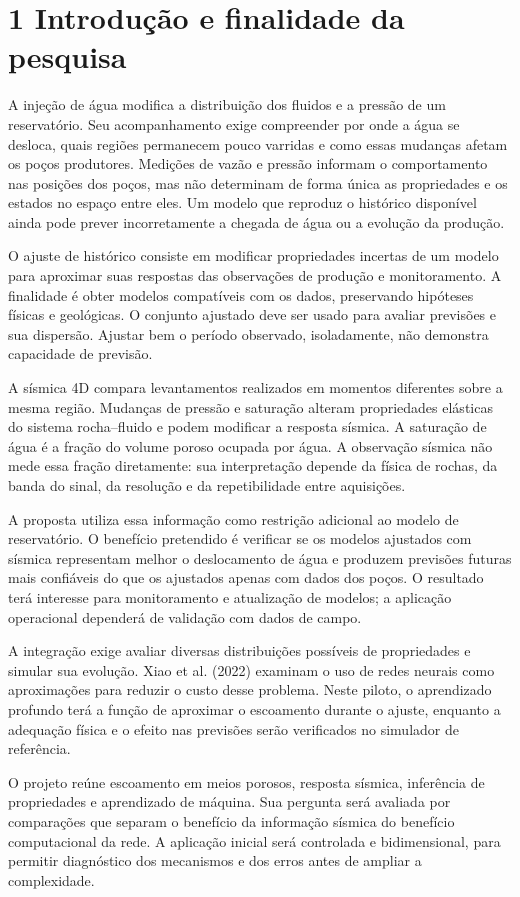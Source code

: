 \documentclass[12pt,a4paper]{article}
\begin{document}
\newpage
\section*{1 Introdução e finalidade da pesquisa}
A injeção de água modifica a distribuição dos fluidos e a pressão de um reservatório. Seu acompanhamento exige compreender por onde a água se desloca, quais regiões permanecem pouco varridas e como essas mudanças afetam os poços produtores. Medições de vazão e pressão informam o comportamento nas posições dos poços, mas não determinam de forma única as propriedades e os estados no espaço entre eles. Um modelo que reproduz o histórico disponível ainda pode prever incorretamente a chegada de água ou a evolução da produção.\par
O ajuste de histórico consiste em modificar propriedades incertas de um modelo para aproximar suas respostas das observações de produção e monitoramento. A finalidade é obter modelos compatíveis com os dados, preservando hipóteses físicas e geológicas. O conjunto ajustado deve ser usado para avaliar previsões e sua dispersão. Ajustar bem o período observado, isoladamente, não demonstra capacidade de previsão.\par
A sísmica 4D compara levantamentos realizados em momentos diferentes sobre a mesma região. Mudanças de pressão e saturação alteram propriedades elásticas do sistema rocha--fluido e podem modificar a resposta sísmica. A saturação de água é a fração do volume poroso ocupada por água. A observação sísmica não mede essa fração diretamente: sua interpretação depende da física de rochas, da banda do sinal, da resolução e da repetibilidade entre aquisições.\par
A proposta utiliza essa informação como restrição adicional ao modelo de reservatório. O benefício pretendido é verificar se os modelos ajustados com sísmica representam melhor o deslocamento de água e produzem previsões futuras mais confiáveis do que os ajustados apenas com dados dos poços. O resultado terá interesse para monitoramento e atualização de modelos; a aplicação operacional dependerá de validação com dados de campo.\par
A integração exige avaliar diversas distribuições possíveis de propriedades e simular sua evolução. Xiao et al. (2022) examinam o uso de redes neurais como aproximações para reduzir o custo desse problema. Neste piloto, o aprendizado profundo terá a função de aproximar o escoamento durante o ajuste, enquanto a adequação física e o efeito nas previsões serão verificados no simulador de referência.\par
O projeto reúne escoamento em meios porosos, resposta sísmica, inferência de propriedades e aprendizado de máquina. Sua pergunta será avaliada por comparações que separam o benefício da informação sísmica do benefício computacional da rede. A aplicação inicial será controlada e bidimensional, para permitir diagnóstico dos mecanismos e dos erros antes de ampliar a complexidade.\par
\end{document}
